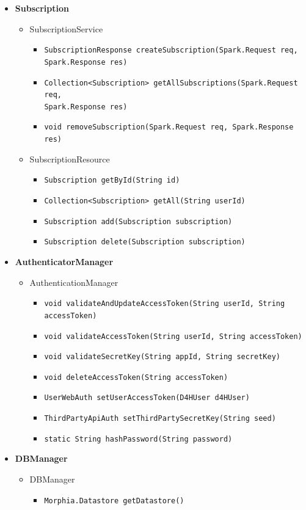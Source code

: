 \documentclass[a4paper, hidelinks, 12pt]{report}
\begin{document}
\begin{itemize}
			\item{\textbf{Subscription}}
			\begin{itemize}
				\item{SubscriptionService}
					\begin{itemize}
						\item{\verb|SubscriptionResponse createSubscription(Spark.Request req,|\\ \verb|Spark.Response res)|}
						\item{\verb|Collection<Subscription> getAllSubscriptions(Spark.Request req,|\\ \verb|Spark.Response res)|}
						\item{\verb|void removeSubscription(Spark.Request req, Spark.Response res)|}
					\end{itemize}
				\item{SubscriptionResource}
					\begin{itemize}
						\item{\verb|Subscription getById(String id)|}
						\item{\verb|Collection<Subscription> getAll(String userId)|}
						\item{\verb|Subscription add(Subscription subscription)|}
						\item{\verb|Subscription delete(Subscription subscription)|}
					\end{itemize}
			\end{itemize}
			\item{\textbf{AuthenticatorManager}}
			\begin{itemize}
				\item{AuthenticationManager}
					\begin{itemize}
						\item{\verb|void validateAndUpdateAccessToken(String userId, String accessToken)|}
						\item{\verb|void validateAccessToken(String userId, String accessToken)|}
						\item{\verb|void validateSecretKey(String appId, String secretKey)|}
						\item{\verb|void deleteAccessToken(String accessToken)|}
						\item{\verb|UserWebAuth setUserAccessToken(D4HUser d4HUser)|}
						\item{\verb|ThirdPartyApiAuth setThirdPartySecretKey(String seed)|}
						\item{\verb|static String hashPassword(String password)|}
					\end{itemize}
			\end{itemize}
			\item{\textbf{DBManager}}
			\begin{itemize}
				\item{DBManager}
					\begin{itemize}
						\item{\verb|Morphia.Datastore getDatastore()|}
					\end{itemize}
			\end{itemize}
	\end{itemize}
			
\end{document}

